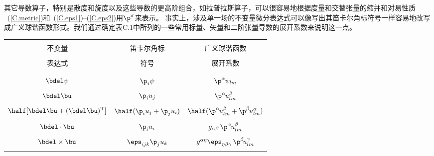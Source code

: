 其它导数算子，特别是散度和旋度以及这些导数的更高阶组合，如拉普拉斯算子，可以很容易地根据度量和交替张量的缩并和对易性质
~(\ref{C.metric})和~(\ref{C.eps1})--(\ref{C.eps2})用$\p^{\sigma}$来表示。
事实上，涉及单一场的不变量微分表达式可以像写出其笛卡尔角标符号一样容易地改写成广义球谐函数形式。我们通过确定表C.1中所列的一些常用标量、矢量和二阶张量导数的展开系数来说明这一点。
\begin{table}[!b]
\centering
\begin{tabular}{|c|c|c|} \hline
& & \\
不变量 &  笛卡尔角标 & 广义球谐函数 \\
\vspace{-1.0 ex} & \vspace{-1.0 ex} & \vspace{-1.0 ex} \\
表达式 & 符号 & 展开系数 \\
& & \\ \hline
& & \\
$\bdel\psi$ & $\p_i\psi$ & $\p^{\alpha}\hspace{-0.2 mm}\psi_{lm}$ \\
& & \\
$\bdel\bu$ & $\p_iu_j$ & $\p^\alpha\hspace{-0.3 mm}u_{lm}^\beta$ \\
& & \\
$\half[\bdel\bu+(\bdel\bu)^{\rm T}]$ & $\half(\p_iu_j+\p_ju_i)$ &
$\half(\p^\alpha\hspace{-0.3 mm}u_{lm}^\beta
+\p^\beta\hspace{-0.3 mm}u_{lm}^\alpha)$ \\
& & \\
$\bdel\cdot\bu$ & $\p_iu_i$ & $g_{\alpha\beta\,}
\p^{\alpha}\hspace{-0.3 mm}u_{lm}^{\beta}$ \\
& & \\
$\bdel\times\bu$ & $\eps_{ijk}\p_ju_k$
& $g^{\alpha\eta}\eps_{\eta\beta\gamma}\,
\p^{\beta}\hspace{-0.6 mm}u^{\gamma}_{lm}$ \\
& & \\

\end{tabular}
\end{table}
